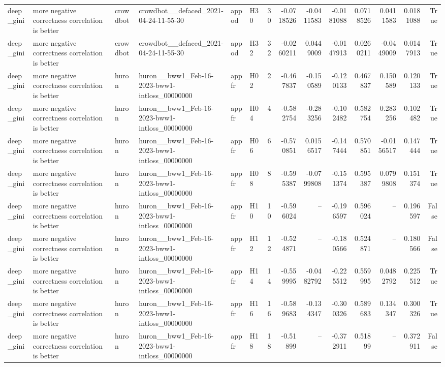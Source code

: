 \begin{longtable}{llllllrrrrrrrr}
deep\_gini & more negative correctness correlation is better & crowdbot & crowdbot\_\_defaced\_2021-04-24-11-55-30 & appod & H30 & 30 & -0.0718526 & -0.0411583 & -0.0181088 & 0.0718526 & 0.0411583 & 0.0181088 & True \\
deep\_gini & more negative correctness correlation is better & crowdbot & crowdbot\_\_defaced\_2021-04-24-11-55-30 & appod & H32 & 32 & -0.0260211 & 0.0449009 & -0.0147913 & 0.0260211 & -0.0449009 & 0.0147913 & True \\
deep\_gini & more negative correctness correlation is better & huron & huron\_\_bww1\_Feb-16-2023-bww1-intloss\_00000000 & appfr & H02 & 2 & -0.467837 & -0.150589 & -0.120133 & 0.467837 & 0.150589 & 0.120133 & True \\
deep\_gini & more negative correctness correlation is better & huron & huron\_\_bww1\_Feb-16-2023-bww1-intloss\_00000000 & appfr & H04 & 4 & -0.582754 & -0.283256 & -0.102482 & 0.582754 & 0.283256 & 0.102482 & True \\
deep\_gini & more negative correctness correlation is better & huron & huron\_\_bww1\_Feb-16-2023-bww1-intloss\_00000000 & appfr & H06 & 6 & -0.570851 & 0.0156517 & -0.147444 & 0.570851 & -0.0156517 & 0.147444 & True \\
deep\_gini & more negative correctness correlation is better & huron & huron\_\_bww1\_Feb-16-2023-bww1-intloss\_00000000 & appfr & H08 & 8 & -0.595387 & -0.0799808 & -0.151374 & 0.595387 & 0.0799808 & 0.151374 & True \\
deep\_gini & more negative correctness correlation is better & huron & huron\_\_bww1\_Feb-16-2023-bww1-intloss\_00000000 & appfr & H10 & 10 & -0.596024 & -- & -0.196597 & 0.596024 & -- & 0.196597 & False \\
deep\_gini & more negative correctness correlation is better & huron & huron\_\_bww1\_Feb-16-2023-bww1-intloss\_00000000 & appfr & H12 & 12 & -0.524871 & -- & -0.180566 & 0.524871 & -- & 0.180566 & False \\
deep\_gini & more negative correctness correlation is better & huron & huron\_\_bww1\_Feb-16-2023-bww1-intloss\_00000000 & appfr & H14 & 14 & -0.559995 & -0.0482792 & -0.225512 & 0.559995 & 0.0482792 & 0.225512 & True \\
deep\_gini & more negative correctness correlation is better & huron & huron\_\_bww1\_Feb-16-2023-bww1-intloss\_00000000 & appfr & H16 & 16 & -0.589683 & -0.134347 & -0.300326 & 0.589683 & 0.134347 & 0.300326 & True \\
deep\_gini & more negative correctness correlation is better & huron & huron\_\_bww1\_Feb-16-2023-bww1-intloss\_00000000 & appfr & H18 & 18 & -0.51899 & -- & -0.372911 & 0.51899 & -- & 0.372911 & False \\

\end{longtable}
